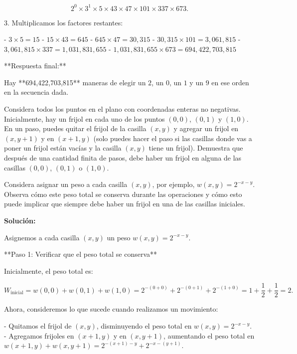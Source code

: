 \documentclass[11pt]{scrartcl}
\begin{document}
\begin{problem}
\begin{solu}
     $$
     2^{0} \times 3^{1} \times 5 \times 43 \times 47 \times 101 \times 337 \times 673.
     $$

3. Multiplicamos los factores restantes:

   - $3 \times 5 = 15$
   - $15 \times 43 = 645$
   - $645 \times 47 = 30,\!315$
   - $30,\!315 \times 101 = 3,\!061,\!815$
   - $3,\!061,\!815 \times 337 = 1,\!031,\!831,\!655$
   - $1,\!031,\!831,\!655 \times 673 = 694,\!422,\!703,\!815$

**Respuesta final:**

Hay **694,422,703,815** maneras de elegir un $2$, un $0$, un $1$ y un $9$ en ese orden en la secuencia dada.

\end{solu}
\end{problem}

\begin{problem}
Considera todos los puntos en el plano con coordenadas enteras no negativas. Inicialmente, hay un frijol en cada uno de los puntos $(0, 0)$, $(0, 1)$ y $(1, 0)$. En un paso, puedes quitar el frijol de la casilla $(x, y)$ y agregar un frijol en $(x, y+1)$ y en $(x+1, y)$ (solo puedes hacer el paso si las casillas donde vas a poner un frijol están vacías y la casilla $(x, y)$ tiene un frijol). Demuestra que después de una cantidad finita de pasos, debe haber un frijol en alguna de las casillas $(0, 0)$, $(0, 1)$ o $(1, 0)$.
    
\begin{hint}
Considera asignar un peso a cada casilla $(x, y)$, por ejemplo, $w(x, y) = 2^{-x - y}$. Observa cómo este peso total se conserva durante las operaciones y cómo esto puede implicar que siempre debe haber un frijol en una de las casillas iniciales.

\begin{solu}
\textbf{Solución:}

Asignemos a cada casilla $(x, y)$ un peso $w(x, y) = 2^{-x - y}$. 

**Paso 1: Verificar que el peso total se conserva**

Inicialmente, el peso total es:

$$
W_{\text{inicial}} = w(0,0) + w(0,1) + w(1,0) = 2^{-(0+0)} + 2^{-(0+1)} + 2^{-(1+0)} = 1 + \frac{1}{2} + \frac{1}{2} = 2.
$$

Ahora, consideremos lo que sucede cuando realizamos un movimiento:

- Quitamos el frijol de $(x, y)$, disminuyendo el peso total en $w(x, y) = 2^{-x - y}$.
- Agregamos frijoles en $(x+1, y)$ y en $(x, y+1)$, aumentando el peso total en $w(x+1, y) + w(x, y+1) = 2^{-(x+1) - y} + 2^{-x - (y+1)}$.


\end{solu}
\end{hint}
\end{problem}
\end{document}
